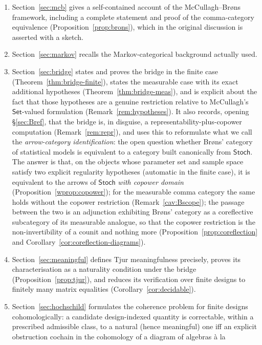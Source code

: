 \documentclass[11pt,a4paper]{article}
\theoremstyle{plain}
\theoremstyle{definition}
\theoremstyle{remark}
\newcommand{\cat}[1]{\mathsf{#1}}
\newcommand{\Set}{\cat{Set}}
\newcommand{\Stoch}{\cat{Stoch}}
\begin{document}
\begin{enumerate}
\item Section~\ref{sec:mcb} gives a self-contained account of the
McCullagh--Br\o ns framework, including a complete statement and proof of the
comma-category equivalence (Proposition~\ref{prop:brons}), which in the
original discussion is asserted with a sketch.
\item Section~\ref{sec:markov} recalls the Markov-categorical background
actually used.
\item Section~\ref{sec:bridge} states and proves the bridge in the finite case
(Theorem~\ref{thm:bridge-finite}), states the measurable case with its exact
additional hypotheses (Theorem~\ref{thm:bridge-meas}), and is explicit about
the fact that those hypotheses are a genuine restriction relative to
McCullagh's $\Set$-valued formulation (Remark~\ref{rem:hypotheses}). It also
records, opening \S\ref{sec:Bref}, that the bridge is, in disguise, a representability-plus-copower
computation (Remark~\ref{rem:repr}), and uses this to
reformulate what we call the \emph{arrow-category identification}: the open
question whether Br\o ns' category of statistical models is equivalent to a
category built canonically from $\Stoch$. The answer is that, on the objects
whose parameter set and sample space satisfy two explicit regularity
hypotheses (automatic in the finite case), it is equivalent to the arrows of
$\Stoch$ \emph{with copower domain} (Proposition~\ref{wprop:copower}); for the
measurable comma category the same holds without the copower restriction
(Remark~\ref{cav:Bscope}); the passage
between the two is an adjunction exhibiting Br\o ns' category as a coreflective
subcategory of its measurable analogue, so that the copower restriction is the
non-invertibility of a counit and nothing more
(Proposition~\ref{prop:coreflection} and
Corollary~\ref{cor:coreflection-diagrams}).
\item Section~\ref{sec:meaningful} defines Tjur meaningfulness precisely,
proves its characterisation as a naturality condition under the bridge
(Proposition~\ref{prop:tjur}), and reduces its verification over finite
designs to finitely many matrix equalities (Corollary~\ref{cor:decidable}).
\item Section~\ref{sec:hochschild} formulates the coherence problem for finite
designs cohomologically: a candidate design-indexed quantity is correctable,
within a prescribed admissible class, to a natural (hence meaningful) one iff an
explicit obstruction cochain in the cohomology of a diagram of algebras \`a la

\end{enumerate}
\end{document}
